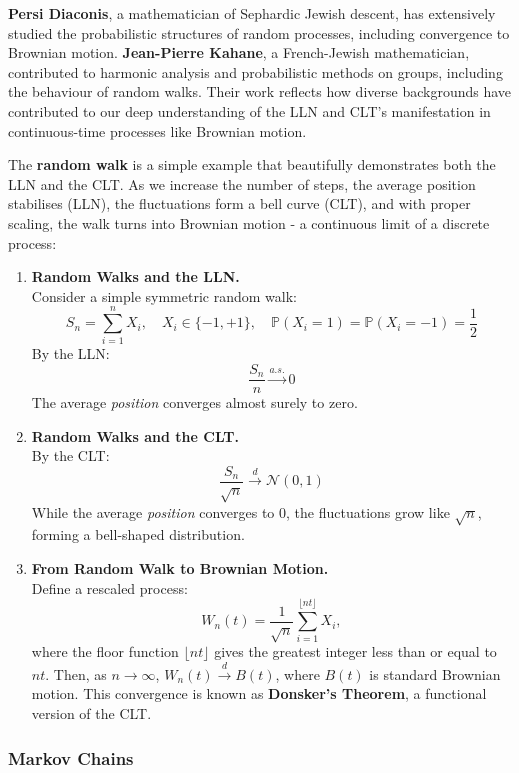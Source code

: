 \textbf{Persi Diaconis}, a mathematician of Sephardic Jewish descent, has extensively studied the probabilistic structures of random processes, including convergence to Brownian motion. 
%
\textbf{Jean-Pierre Kahane}, a French-Jewish mathematician, contributed to harmonic analysis and probabilistic methods on groups, including the behaviour of random walks. Their work reflects how diverse backgrounds have contributed to our deep understanding of the LLN and CLT's manifestation in continuous-time processes like Brownian motion.

The \textbf{random walk} is a simple example that beautifully demonstrates both the LLN and the CLT. As we increase the number of steps, the average position stabilises (LLN), the fluctuations form a bell curve (CLT), and with proper scaling, the walk turns into Brownian motion - a continuous limit of a discrete process:

\begin{enumerate}
    \item \textbf{Random Walks and the LLN.} \\
    Consider a simple symmetric random walk:
    \[
    S_n =  \sum^n_{i=1} X_i , \quad X_i \in \{-1, +1\}, \quad \mathbb{P}(X_i = 1) = \mathbb{P}(X_i = -1) = \frac{1}{2}
    \]
    By the LLN:
    \[
    \frac{S_n}{n} \xrightarrow{a.s.} 0
    \]
    The average \textit{position} converges almost surely to zero.

    \item \textbf{Random Walks and the CLT.} \\
    By the CLT:
    \[
    \frac{S_n}{\sqrt{n}} \xrightarrow{d} \mathcal{N}(0, 1)
    \]
    While the average \textit{position} converges to 0, the fluctuations grow like \( \sqrt{n} \), forming a bell-shaped distribution.

    \item \textbf{From Random Walk to Brownian Motion.} \\
    Define a rescaled process:
    \[
    W_n(t) = \frac{1}{\sqrt{n}} \sum_{i=1}^{\lfloor nt \rfloor} X_i,
    \]
    where the floor function $\lfloor nt \rfloor$ gives the greatest integer less than or equal to $nt$.
    Then, as \( n \to \infty \), \( W_n(t) \xrightarrow{d} B(t) \), where \( B(t) \) is standard Brownian motion. This convergence is known as \textbf{Donsker's Theorem}, a functional version of the CLT.
\end{enumerate}
\vspace{-1em}

\subsubsection{Markov Chains}

